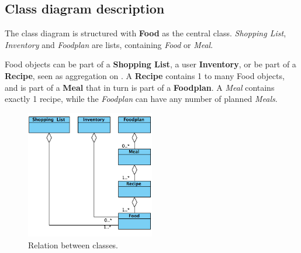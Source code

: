 \subsection{Class diagram description}
The class diagram is structured with \textbf{Food} as the central class. 
\textit{Shopping List}, \textit{Inventory} and \textit{Foodplan} are lists, containing \textit{Food} or \textit{Meal}.

Food objects can be part of a \textbf{Shopping List}, a user \textbf{Inventory}, or be part of a \textbf{Recipe}, seen as aggregation on . A \textbf{Recipe} contains 1 to many Food objects, and is part of a \textbf{Meal} that in turn is part of a \textbf{Foodplan}. A \textit{Meal} contains exactly 1 recipe, while the \textit{Foodplan} can have any number of planned \textit{Meals}.

\begin{figure}[H]
	\centering
	\includegraphics[width=0.50\textwidth]{Grafik/FoodPlanner/FoodPlannerClassDiagram.png}
	\caption{Relation between classes.}
	\label{fig:classDiagram}
\end{figure}